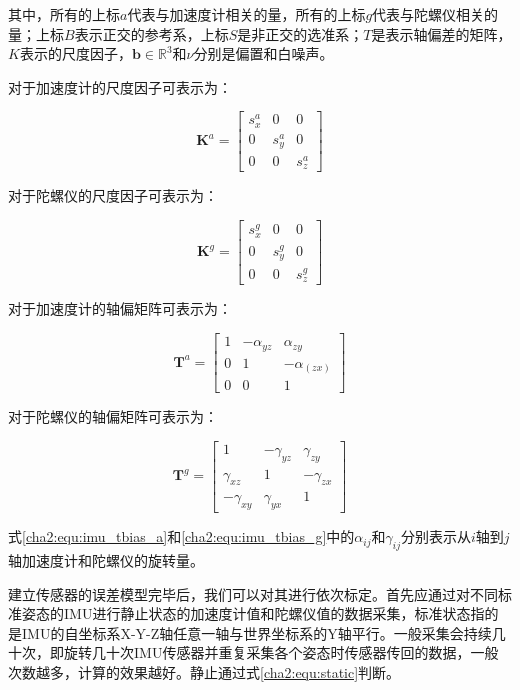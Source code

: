 其中，所有的上标$a$代表与加速度计相关的量，所有的上标$g$代表与陀螺仪相关的量；上标$B$表示正交的参考系，上标$S$是非正交的选准系；$T$是表示轴偏差的矩阵，$K$表示的尺度因子，$\mathbf{b} \in \mathbb{R}^3$和$\nu$分别是偏置和白噪声。

对于加速度计的尺度因子可表示为：

\begin{equation}
  \mathbf{K}^{a} = \begin{bmatrix}
    s^{a}_{x} & 0 & 0\\
    0 & s^{a}_{y} & 0\\
    0 & 0 & s^{a}_{z}
  \end{bmatrix}
\end{equation}

对于陀螺仪的尺度因子可表示为：

\begin{equation}
  \mathbf{K}^{g} = \begin{bmatrix}
    s^{g}_{x} & 0 & 0\\
    0 & s^{g}_{y} & 0\\
    0 & 0 & s^{g}_{z}
  \end{bmatrix}
\end{equation}

对于加速度计的轴偏矩阵可表示为：

\begin{equation}
\label{cha2:equ:imu_tbias_a}
\mathbf{T}^{a} = \begin{bmatrix}
    1 & -\alpha_{yz} & \alpha_{zy}\\
    0 & 1 & -\alpha_(zx)\\
    0 & 0 & 1
  \end{bmatrix}
\end{equation}

对于陀螺仪的轴偏矩阵可表示为：

\begin{equation}
  \label{cha2:equ:imu_tbias_g}
  \mathbf{T}^{g} = \begin{bmatrix}
    1 & -\gamma_{yz} & \gamma_{zy}\\
    \gamma_{xz} & 1 & -\gamma_{zx}\\
    -\gamma_{xy} & \gamma_{yx} & 1
  \end{bmatrix}
\end{equation}

式\ref{cha2:equ:imu_tbias_a}和\ref{cha2:equ:imu_tbias_g}中的$\alpha_{ij}$和${\gamma_{ij}}$分别表示从$i$轴到$j$轴加速度计和陀螺仪的旋转量。

建立传感器的误差模型完毕后，我们可以对其进行依次标定。首先应通过对不同标准姿态的IMU进行静止状态的加速度计值和陀螺仪值的数据采集，标准状态指的是IMU的自坐标系X-Y-Z轴任意一轴与世界坐标系的Y轴平行。一般采集会持续几十次，即旋转几十次IMU传感器并重复采集各个姿态时传感器传回的数据，一般次数越多，计算的效果越好。静止通过式\ref{cha2:equ:static}判断。

